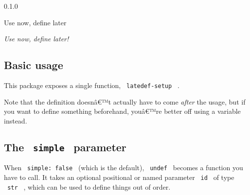 { 0.1.0 }

Use now, define later

\label{readme}
\emph{Use now, define later!}

\subsection{Basic usage}\label{basic-usage}

This package exposes a single function, \texttt{\ latedef-setup\ } .

\begin{Shaded}
\begin{Highlighting}[]

\end{Highlighting}
\end{Shaded}


Note that the definition doesnâ€™t actually have to come \emph{after}
the usage, but if you want to define something beforehand, youâ€™re
better off using a variable instead.

\begin{Shaded}
\begin{Highlighting}[]


\end{Highlighting}
\end{Shaded}


\subsection{\texorpdfstring{The \texttt{\ simple\ }
parameter}{The  simple  parameter}}\label{the-simple-parameter}

When \texttt{\ simple:\ false\ } (which is the default),
\texttt{\ undef\ } becomes a function you have to call. It takes an
optional positional or named parameter \texttt{\ id\ } of type
\texttt{\ str\ } , which can be used to define things out of order.

